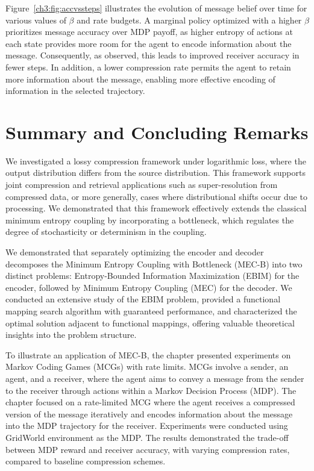 Figure~\ref{ch3:fig:accvssteps} illustrates the evolution of message belief over time for various values of \(\beta\) and rate budgets. A marginal policy optimized with a higher \(\beta\) prioritizes message accuracy over MDP payoff, as higher entropy of actions at each state provides more room for the agent to encode information about the message. Consequently, as observed, this leads to improved receiver accuracy in fewer steps. In addition, a lower compression rate permits the agent to retain more information about the message, enabling more effective encoding of information in the selected trajectory.


\FloatBarrier

\section{Summary and Concluding Remarks}

We investigated a lossy compression framework under logarithmic loss, where the output distribution differs from the source distribution. This framework supports joint compression and retrieval applications such as super-resolution from compressed data, or more generally, cases where distributional shifts occur due to processing. We demonstrated that this framework effectively extends the classical minimum entropy coupling by incorporating a bottleneck, which regulates the degree of stochasticity or determinism in the coupling.

We demonstrated that separately optimizing the encoder and decoder decomposes the Minimum Entropy Coupling with Bottleneck (MEC-B) into two distinct problems: Entropy-Bounded Information Maximization (EBIM) for the encoder, followed by Minimum Entropy Coupling (MEC) for the decoder. We conducted an extensive study of the EBIM problem, provided a functional mapping search algorithm with guaranteed performance, and characterized the optimal solution adjacent to functional mappings, offering valuable theoretical insights into the problem structure.

To illustrate an application of MEC-B, the chapter presented experiments on Markov Coding Games (MCGs) with rate limits. MCGs involve a sender, an agent, and a receiver, where the agent aims to convey a message from the sender to the receiver through actions within a Markov Decision Process (MDP). The chapter focused on a rate-limited MCG where the agent receives a compressed version of the message iteratively and encodes information about the message into the MDP trajectory for the receiver. Experiments were conducted using GridWorld environment as the MDP. The results demonstrated the trade-off between MDP reward and receiver accuracy, with varying compression rates, compared to baseline compression schemes.


